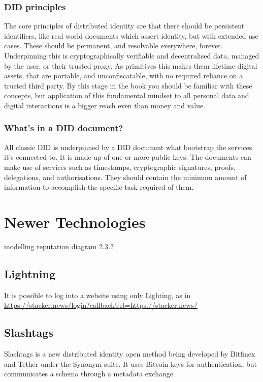 \subsubsection{DID principles}
The core principles of distributed identity are that there should be persistent identifiers, like real world documents which assert identity, but with extended use cases. These should be permanent, and resolvable everywhere, forever. Underpinning this is cryptographically verifiable and decentralised data, managed by the user, or their trusted proxy. As primitives this makes them lifetime digital assets, that are portable, and unconfiscatable, with no required reliance on a trusted third party. By this stage in the book you should be familiar with these concepts, but application of this fundamental mindset to all personal data and digital interactions is a bigger reach even than money and value.
\subsubsection{What's in a DID document?}
All classic DID is underpinned by a DID document what bootstrap the services it's connected to. It is made up of one or more public keys. The documents can make use of services such as timestamps, cryptographic signatures, proofs, delegations, and authorisations. They should contain the minimum amount of information to accomplish the specific task required of them.

\section{Newer Technologies}

modelling reputation diagram 2.3.2 \cite{mui2002computational}
\subsection{Lightning}
It is possible to log into a website using only Lighting, as in \href{Stacker News}{https://stacker.news/login?callbackUrl=https://stacker.news/}

\subsection{Slashtags}
Slashtags is a new distributed identity open method being developed by Bitfinex and Tether under the Synonym suite. It uses Bitcoin keys for authentication, but communicates a schema through a metadata exchange.
